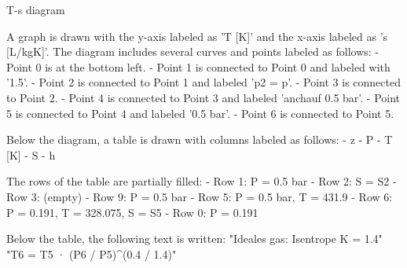 T-s diagram  

A graph is drawn with the y-axis labeled as 'T [K]' and the x-axis labeled as 's [L/kgK]'. The diagram includes several curves and points labeled as follows:  
- Point 0 is at the bottom left.  
- Point 1 is connected to Point 0 and labeled with '1.5'.  
- Point 2 is connected to Point 1 and labeled 'p2 = p'.  
- Point 3 is connected to Point 2.  
- Point 4 is connected to Point 3 and labeled 'anchauf 0.5 bar'.  
- Point 5 is connected to Point 4 and labeled '0.5 bar'.  
- Point 6 is connected to Point 5.  

Below the diagram, a table is drawn with columns labeled as follows:  
- z  
- P  
- T [K]  
- S  
- h  

The rows of the table are partially filled:  
- Row 1: P = 0.5 bar  
- Row 2: S = S2  
- Row 3: (empty)  
- Row 9: P = 0.5 bar  
- Row 5: P = 0.5 bar, T = 431.9  
- Row 6: P = 0.191, T = 328.075, S = S5  
- Row 0: P = 0.191  

Below the table, the following text is written:  
"Ideales gas: Isentrope K = 1.4"  
"T6 = T5 · (P6 / P5)^(0.4 / 1.4)"